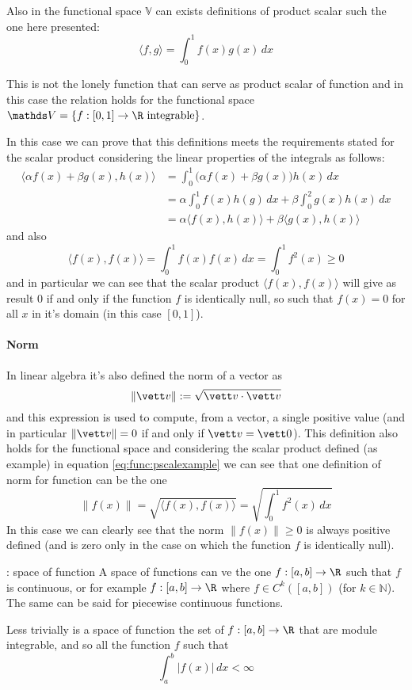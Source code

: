 Also in the functional space $\mathds V$ can exists definitions of product scalar such the one here presented:
\begin{equation} \label{eq:func:pscalexample}
	\langle f,g\rangle = \int_0^1 f(x)g(x)\, dx
\end{equation}
\begin{note}
	This is not the lonely function that can serve as product scalar of function and in this case the relation holds for the functional space $\mathds V = \{ f:[0,1] \rightarrow \R \textrm{ integrable} \}$.
\end{note}
In this case we can prove that this definitions meets the requirements stated for the scalar product considering the linear properties of the integrals as follows:
\begin{align*}
	\langle \alpha f(x) + \beta g(x),h(x) \rangle & = \int_0^1 \Big(\alpha f(x) + \beta g(x)\Big)h(x) \, dx \\ 
	& = \alpha \int_0^1 f(x)h(g) \, dx + \beta \int_0^2 g(x)h(x) \, dx \\
	& = \alpha \langle f(x),h(x) \rangle + \beta \langle g(x),h(x) \rangle
\end{align*}
and also
\[ \langle f(x),f(x) \rangle = \int_0^1 f(x) f(x) \, dx = \int_0^1 f^2(x)  \geq 0  \]
and in particular we can see that the scalar product $\langle f(x),f(x)\rangle$ will give as result 0 if and only if the function $f$ is identically null, so such that $f(x) = 0$ for all $x$ in it's domain (in this case $[0,1]$).

\paragraph{Norm} In linear algebra it's also defined the norm of a vector as
\[ \|\vett v\| := \sqrt{\vett v \cdot \vett v} \]
and this expression is used to compute, from a vector, a single positive value  (and in particular $\|\vett v\| = 0$ if and only if $\vett v = \vett 0$). This definition also holds for the functional space and considering the scalar product defined (as example) in equation \ref{eq:func:pscalexample} we can see that one definition of norm for function can be the one
\[ \|f(x)\| = \sqrt{\langle f(x),f(x)\rangle} = \sqrt{\int_0^1f^2(x) \, dx} \]
In this case we can clearly see that the norm $\|f(x)\| \geq 0$ is always positive defined (and is zero only in the case on which the function $f$ is identically null).


\begin{example}{: space of function}
	A space of functions can ve the one $f:[a,b]\rightarrow \R$ such that $f$ is continuous, or for example $f:[a,b]\rightarrow \R$ where $f\in C^k([a,b])$ (for $k\in \mathds N$). The same can be said for piecewise continuous functions.
	
	Less trivially is a space of function the set of $f:[a,b]\rightarrow \R$ that are module integrable, and so all the function $f$ such that
	\[\int_a^b |f(x)|\, dx < \infty\]
	
\end{example}

